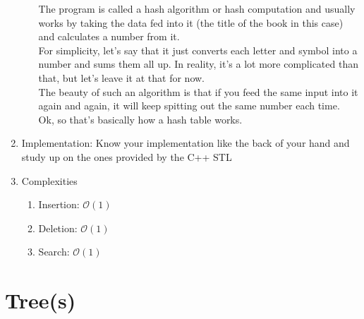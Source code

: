 \documentclass [12pt, executivepaper]{article}
\begin{document}
\begin{enumerate}
\begin{enumerate}
The program is called a hash algorithm or hash computation and usually works by taking the data fed into it (the title of the book in this case) and calculates a number from it.\\

For simplicity, let's say that it just converts each letter and symbol into a number and sums them all up. In reality, it's a lot more complicated than that, but let's leave it at that for now.\\

The beauty of such an algorithm is that if you feed the same input into it again and again, it will keep spitting out the same number each time.\\

Ok, so that's basically how a hash table works.

\end{enumerate}

\item Implementation: Know your implementation like the back of your hand and study up on the ones provided by the C++ STL

\item Complexities

\begin{enumerate}

\item Insertion: $\mathcal{O}(1)$

\item Deletion: $\mathcal{O}(1)$

\item Search: $\mathcal{O}(1)$

\end{enumerate}

\end{enumerate}

\pagebreak

\vspace*{-40mm}

\section*{Tree(s)}
\end{document}

